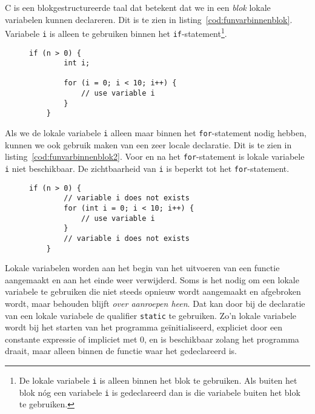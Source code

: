 C is een blokgestructureerde taal dat betekent dat we in een \textsl{blok} lokale variabelen kunnen declareren. Dit is te zien in listing~\ref{cod:funvarbinnenblok}. Variabele \texttt{i} is alleen te gebruiken binnen het \texttt{if}-statement\footnote{De lokale variabele \texttt{i} is alleen binnen het blok te gebruiken. Als buiten het blok nóg een variabele \texttt{i} is gedeclareerd dan is die variabele buiten het blok te gebruiken.}.

\begin{figure}[!ht]
\begin{lstlisting}[caption=Variabele binnen een blok.,label=cod:funvarbinnenblok]
    if (n > 0) {
        int i;
        
        for (i = 0; i < 10; i++) {
            // use variable i
        }
    }
\end{lstlisting}
\end{figure}

Als we de lokale variabele \texttt{i} alleen maar binnen het \texttt{for}-statement nodig hebben, kunnen we ook gebruik maken van een zeer locale declaratie. Dit is te zien in listing~\ref{cod:funvarbinnenblok2}. Voor en na het \texttt{for}-statement is lokale variabele \texttt{i} niet beschikbaar. De zichtbaarheid van \texttt{i} is beperkt tot het \texttt{for}-statement.

\begin{figure}[H]
\begin{lstlisting}[caption=Variabele binnen een blok.,label=cod:funvarbinnenblok2]
    if (n > 0) {
        // variable i does not exists
        for (int i = 0; i < 10; i++) {
            // use variable i
        }
        // variable i does not exists
    }
\end{lstlisting}
\end{figure}

Lokale variabelen worden aan het begin van het uitvoeren van een functie aangemaakt en aan het einde weer verwijderd. Soms is het nodig om een lokale variabele te gebruiken die niet steeds opnieuw wordt aangemaakt en afgebroken wordt, maar behouden blijft \textsl{over aanroepen heen}. Dat kan door bij de declaratie van een lokale variabele de qualifier \texttt{static} te gebruiken. Zo'n lokale variabele wordt bij het starten van het programma geïnitialiseerd, expliciet door een constante expressie of impliciet met 0, en is beschikbaar zolang het programma draait, maar alleen binnen de functie waar het gedeclareerd is.

